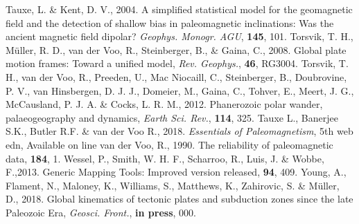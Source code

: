 \begin{thebibliography}{}
  Tauxe, L. \& Kent, D. V., 2004. A simplified statistical model for the
  geomagnetic field and the detection of shallow bias in paleomagnetic
  inclinations: Was the ancient magnetic field dipolar? \textit{Geophys.
  Monogr. AGU}, \textbf{145}, 101.
  Torsvik, T. H., M{\"{u}}ller, R. D., van der Voo, R., Steinberger, B., \&
  Gaina, C., 2008. Global plate motion frames: Toward a unified model,
  \textit{Rev. Geophys.}, \textbf{46}, RG3004.
  Torsvik, T. H., van der Voo, R., Preeden, U., Mac Niocaill, C., Steinberger,
  B., Doubrovine, P. V., van Hinsbergen, D. J. J., Domeier, M., Gaina, C.,
  Tohver, E., Meert, J. G., McCausland, P. J. A. \& Cocks, L. R. M., 2012.
  Phanerozoic polar wander, palaeogeography and dynamics, \textit{Earth Sci.
  Rev.}, \textbf{114}, 325.
  Tauxe L., Banerjee S.K., Butler R.F. \& van der Voo R., 2018.
  \textit{Essentials of Paleomagnetism}, 5th web edn, Available on line
  van der Voo, R., 1990. The reliability of paleomagnetic data,
  \tecto{}\textbf{184}, 1.
  Wessel, P., Smith, W. H. F., Scharroo, R., Luis, J. \& Wobbe, F.,2013. Generic
  Mapping Tools: Improved version released, \eos{}\textbf{94}, 409.
  Young, A., Flament, N., Maloney, K., Williams, S., Matthews, K., Zahirovic,
  S.
  \& Müller, D., 2018. Global kinematics of tectonic plates and subduction zones
  since the late Paleozoic Era, \textit{Geosci. Front.},
  \textbf{in press}, 000.
\end{thebibliography}~\label{lastpage}
